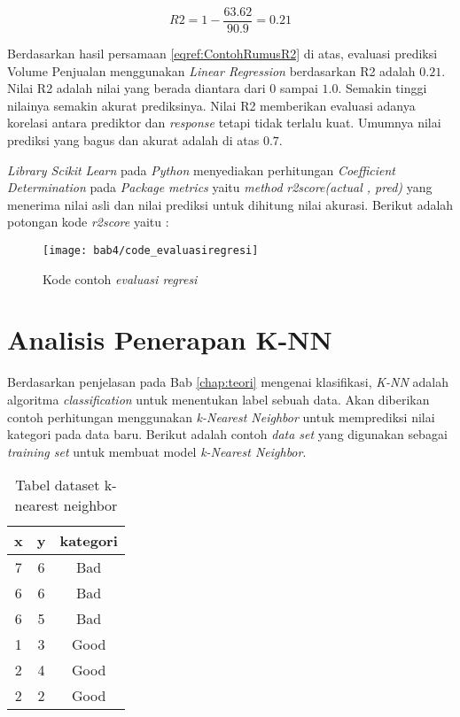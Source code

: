 \begin{equation}
R2 = 1 - \frac{63.62}{90.9} = 0.21
\label{eqref:ContohRumusR2}
\end{equation}

Berdasarkan hasil persamaan \eqref{eqref:ContohRumusR2} di atas, evaluasi prediksi Volume Penjualan menggunakan \textit{Linear Regression} berdasarkan R2 adalah $0.21$. Nilai R2 adalah nilai yang berada diantara dari $0$ sampai $1.0$. Semakin tinggi nilainya semakin akurat prediksinya. Nilai R2 memberikan evaluasi adanya korelasi antara prediktor dan \textit{response} tetapi tidak terlalu kuat. Umumnya nilai prediksi yang bagus dan akurat adalah di atas $0.7$.

\textit{Library Scikit Learn} pada \textit{Python} menyediakan perhitungan \textit{Coefficient Determination}  pada \textit{Package} \textit{metrics} yaitu \textit{method} \textit{r2\textunderscore score(actual , pred)} yang menerima nilai asli dan nilai prediksi untuk dihitung nilai akurasi. Berikut adalah potongan kode \textit{r2\textunderscore score} yaitu : 

%
%


\begin{figure}[H]
	\centering  
	\texttt{[image: bab4/code\_evaluasiregresi]}   
	\caption{Kode contoh \textit{evaluasi regresi}}
	\label{fig:code_evaluasiregresi} 
\end{figure}

\section{Analisis Penerapan K-NN}
Berdasarkan penjelasan pada Bab \ref{chap:teori} mengenai klasifikasi, \textit{K-NN} adalah algoritma \textit{classification} untuk menentukan label sebuah data. Akan diberikan contoh perhitungan menggunakan \textit{k-Nearest Neighbor} untuk memprediksi nilai kategori pada data baru. Berikut adalah contoh \textit{data set} yang digunakan sebagai \textit{training set} untuk membuat model \textit{k-Nearest Neighbor}.

\begin{table}[H]
\caption{Tabel dataset k-nearest neighbor}
\centering 
\begin{tabular}{|c|c|c|}
\hline 
x & y & kategori \\ 
\hline 
7 & 6 & Bad \\ 
\hline 
6 & 6 & Bad \\ 
\hline 
6 & 5 & Bad \\ 
\hline 
1 & 3 & Good \\ 
\hline 
2 & 4 & Good \\ 
\hline 
2 & 2 & Good \\ 
\hline 
\end{tabular} 
 \label{tab:datasetknn}
 \end{table}
 
